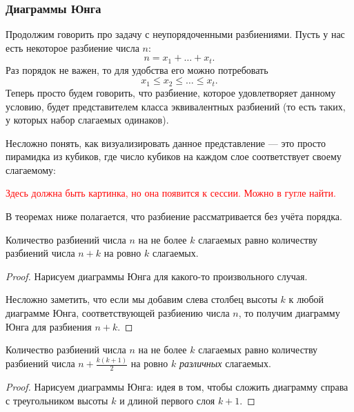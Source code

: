 \subsubsection*{Диаграммы Юнга}

Продолжим говорить про задачу с неупорядоченными разбиениями. Пусть у нас есть некоторое разбиение числа $n$:
\[
	n = x_1 + \ldots + x_t.
\]
Раз порядок не важен, то для удобства его можно потребовать
\[
	x_1 \le x_2 \le \ldots \le x_t.
\]
Теперь просто будем говорить, что разбиение, которое удовлетворяет данному условию, будет представителем класса эквивалентных разбиений (то есть таких, у которых набор слагаемых одинаков).

Несложно понять, как визуализировать данное представление --- это просто пирамидка из кубиков, где число кубиков на каждом слое соответствует своему слагаемому:

\textcolor{red}{Здесь должна быть картинка, но она появится к сессии. Можно в гугле найти.}

\begin{note}
	В теоремах ниже полагается, что разбиение рассматривается без учёта порядка.
\end{note}

\begin{theorem}
	Количество разбиений числа $n$ на не более $k$ слагаемых равно количеству разбиений числа $n + k$ на ровно $k$ слагаемых.
\end{theorem}

\begin{proof}
	Нарисуем диаграммы Юнга для какого-то произвольного случая.
	
	Несложно заметить, что если мы добавим слева столбец высоты $k$ к любой диаграмме Юнга, соответствующей разбиению числа $n$, то получим диаграмму Юнга для разбиения $n + k$.
\end{proof}

\begin{theorem}
	Количество разбиений числа $n$ на не более $k$ слагаемых равно количеству разбиений числа $n + \frac{k(k + 1)}{2}$ на ровно $k$ \textit{различных} слагаемых.
\end{theorem}

\begin{proof}
	Нарисуем диаграммы Юнга:
	идея в том, чтобы сложить диаграмму справа с треугольником высоты $k$ и длиной первого слоя $k + 1$.
\end{proof}


